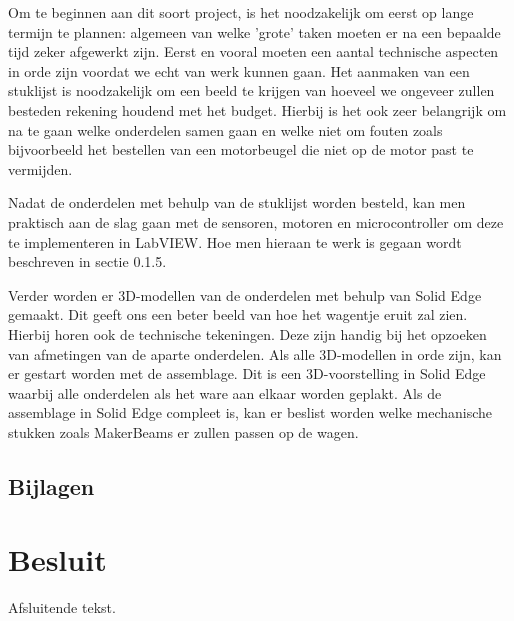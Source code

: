 \documentclass[a4paper,twoside,kulak]{kulakreport} %
\begin{document}





Om te beginnen aan dit soort project, is het noodzakelijk om eerst op lange termijn te plannen: algemeen van welke 'grote' taken moeten er na een bepaalde tijd zeker afgewerkt zijn. Eerst en vooral moeten een aantal technische aspecten in orde zijn voordat we echt van werk kunnen gaan. Het aanmaken van een stuklijst is noodzakelijk om een beeld te krijgen van hoeveel we ongeveer zullen besteden rekening houdend met het budget. Hierbij is het ook zeer belangrijk om na te gaan welke onderdelen samen gaan en welke niet om fouten zoals bijvoorbeeld het bestellen van een motorbeugel die niet op de motor past te vermijden.

Nadat de onderdelen met behulp van de stuklijst worden besteld, kan men praktisch aan de slag gaan met de sensoren, motoren en microcontroller om deze te implementeren in LabVIEW. Hoe men hieraan te werk is gegaan wordt beschreven in sectie 0.1.5.

Verder worden er 3D-modellen van de onderdelen met behulp van Solid Edge gemaakt. Dit geeft ons een beter beeld van hoe het wagentje eruit zal zien. Hierbij horen ook de technische tekeningen. Deze zijn handig bij het opzoeken van afmetingen van de aparte onderdelen. Als alle 3D-modellen in orde zijn, kan er gestart worden met de assemblage. Dit is een 3D-voorstelling in Solid Edge waarbij alle onderdelen als het ware aan elkaar worden geplakt. Als de assemblage in Solid Edge compleet is, kan er beslist worden welke mechanische stukken zoals MakerBeams er zullen passen op de wagen.


\section{Bijlagen}



\chapter*{Besluit}
Afsluitende tekst.




\end{document}
